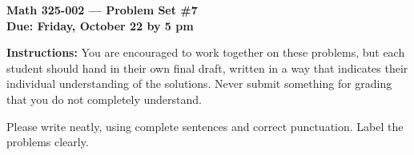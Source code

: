 \documentclass{amsart}
\begin{document}
\begin{center}
{\large\bfseries
Math 325-002 --- Problem Set \#7\\
Due: Friday, October 22 by 5 pm}
\end{center}





{\bf Instructions:} You are encouraged to work together on these
problems, but each student should hand in their own final draft,
written in a way that indicates their individual understanding of
the solutions. Never submit something for grading
that you do not completely understand. 

Please write neatly, using complete sentences and correct
punctuation. Label the problems clearly. 
\end{document}

